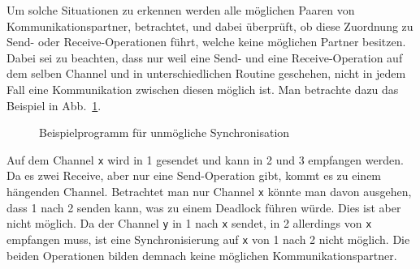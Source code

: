 Um solche Situationen zu erkennen werden alle möglichen Paaren von Kommunikationspartner,
betrachtet, und dabei überprüft, ob diese Zuordnung zu Send- oder Receive-Operationen führt, 
welche keine möglichen Partner besitzen. Dabei sei zu beachten, dass nur weil eine Send- und eine 
Receive-Operation auf dem selben Channel und in unterschiedlichen Routine geschehen, nicht 
in jedem Fall eine Kommunikation zwischen diesen möglich ist. Man betrachte dazu das Beispiel in 
Abb.~\ref{Chap:Analyze-Sec:Channel-SubSec:Dangling-Fig:NoSync}.
\begin{figure}[h!]
  
  \caption{Beispielprogramm für unmögliche Synchronisation}
  \label{Chap:Analyze-Sec:Channel-SubSec:Dangling-Fig:NoSync}
\end{figure}
Auf dem Channel \texttt{x} wird in 1 gesendet und kann in 2 und 3 empfangen werden. Da es zwei Receive, 
aber nur eine Send-Operation gibt, kommt es zu einem hängenden Channel. Betrachtet man nur 
Channel \texttt{x} könnte man davon ausgehen, dass 1 nach 2 senden kann, was zu einem Deadlock
führen würde. Dies ist aber nicht möglich. Da der Channel \texttt{y} in 1 nach \texttt{x} sendet, 
in 2 allerdings von \texttt{x} empfangen muss, ist eine Synchronisierung auf \texttt{x} von 1 nach 
2 nicht möglich. Die beiden Operationen bilden demnach keine möglichen Kommunikationspartner.

